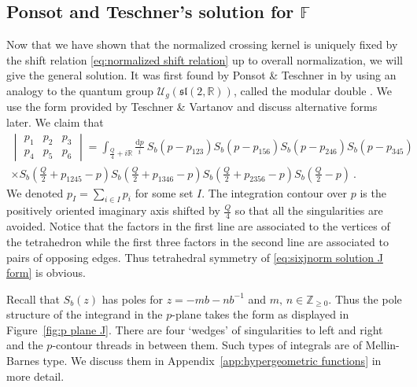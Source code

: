 \documentclass[12pt,a4paper]{article}
\newcommand\ZZ{\mathbb{Z}}
\newcommand\RR{\mathbb{R}}
\newcommand{\sixjnorm}[6]{\begin{vmatrix}
#1 & #2 & #3 \\
#4 & #5 & #6
\end{vmatrix}
}
\begin{document}
\subsection{Ponsot and Teschner's solution for \texorpdfstring{$\mathbb{F}$}{F}} \label{subsec:Ponsot Teschner solution}
Now that we have shown that the normalized crossing kernel is uniquely fixed by the shift relation \eqref{eq:normalized shift relation} up to overall normalization, we will give the general solution. It was first found by Ponsot \& Teschner in \cite{Ponsot:1999uf, Ponsot:2000mt} by using an analogy to the quantum group $\mathcal{U}_g(\mathfrak{sl}(2,\mathbb{R}))$, called the modular double \cite{Faddeev:1999fe}. We use the form provided by Teschner \& Vartanov \cite{Teschner:2012em} and discuss alternative forms later. We claim that 
\begin{multline}  
\sixjnorm{p_1}{p_2}{p_3}{p_4}{p_5}{p_6}=\int_{\frac{Q}{4}+i \RR}\! \frac{\mathrm{d}p}{i}\ S_b(p-p_{123})S_b(p-p_{156})S_b(p-p_{246})S_b(p-p_{345})\\
\times S_b(\tfrac{Q}{2}+p_{1245}-p) S_b(\tfrac{Q}{2}+p_{1346}-p)S_b(\tfrac{Q}{2}+p_{2356}-p)S_b(\tfrac{Q}{2}-p)\ . \label{eq:sixjnorm solution J form}
\end{multline}
We denoted $p_I=\sum_{i \in I} p_i$ for some set $I$. The integration contour over $p$ is the positively oriented imaginary axis shifted by $\frac{Q}{4}$ so that all the singularities are avoided.
Notice that the factors in the first line are associated to the vertices of the tetrahedron while the first three factors in the second line are associated to pairs of opposing edges. Thus tetrahedral symmetry of \eqref{eq:sixjnorm solution J form} is obvious.

Recall that $S_b(z)$ has poles for $z=-m b-n b^{-1}$ and $m,\, n \in \ZZ_{\ge 0}$. Thus the pole structure of the integrand in the $p$-plane takes the form as displayed in Figure~\ref{fig:p plane J}. There are four `wedges' of singularities to left and right and the $p$-contour threads in between them. Such types of integrals are of Mellin-Barnes type. We discuss them in Appendix~\ref{app:hypergeometric functions} in more detail.
\end{document}
